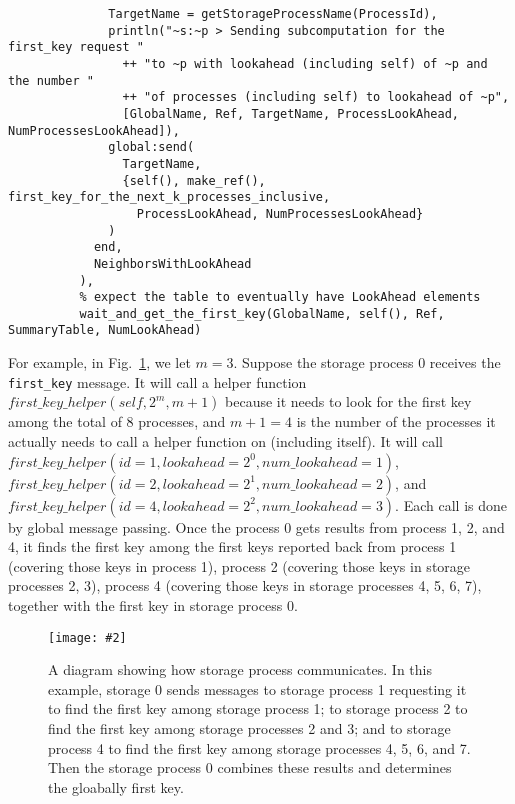 \documentclass[11pt]{article}
\newcommand{\pic}[2]{\begin{center}\texttt{[image: \#2]}\end{center}}
\begin{document}
\begin{algorithm}[H]
\begin{lstlisting}
              TargetName = getStorageProcessName(ProcessId),
              println("~s:~p > Sending subcomputation for the first_key request "
                ++ "to ~p with lookahead (including self) of ~p and the number "
                ++ "of processes (including self) to lookahead of ~p",
                [GlobalName, Ref, TargetName, ProcessLookAhead, NumProcessesLookAhead]),
              global:send(
                TargetName,
                {self(), make_ref(), first_key_for_the_next_k_processes_inclusive,
                  ProcessLookAhead, NumProcessesLookAhead}
              )
            end,
            NeighborsWithLookAhead
          ),
          % expect the table to eventually have LookAhead elements
          wait_and_get_the_first_key(GlobalName, self(), Ref, SummaryTable, NumLookAhead)
\end{lstlisting}
\end{algorithm}

For example, in Fig.~\ref{fig:circle}, we let $m = 3$. Suppose the storage process 0 receives the \texttt{first\_key} message. It will call a helper function $first\_key\_helper(self, 2^m, m + 1)$ because it needs to look for the first key among the total of 8 processes, and $m + 1 = 4$ is the number of the processes it actually needs to call a helper function on (including itself). It will call
$first\_key\_helper(id = 1, lookahead = 2^0, num\_lookahead = 1)$,
$first\_key\_helper(id = 2, lookahead = 2^1, num\_lookahead = 2)$, and
$first\_key\_helper(id = 4, lookahead = 2^2, num\_lookahead = 3)$. Each call is done by global message passing. Once the process 0 gets results from process 1, 2, and 4, it finds the first key among the first keys reported back from process 1 (covering those keys in process 1),
process 2 (covering those keys in storage processes 2, 3),
process 4 (covering those keys in storage processes 4, 5, 6, 7),
together with the first key in storage process 0.
\begin{figure}[H]
\pic{0.35}{circle}
\label{fig:circle}
\caption{A diagram showing how storage process communicates. In this example, storage 0 sends messages to storage process 1 requesting it to find the first key among storage process 1; to storage process 2 to find the first key among storage processes 2 and 3; and to storage process 4 to find the first key among storage processes 4, 5, 6,  and 7. Then the storage process 0 combines these results and determines the gloabally first key.}
\end{figure}
\end{document}
